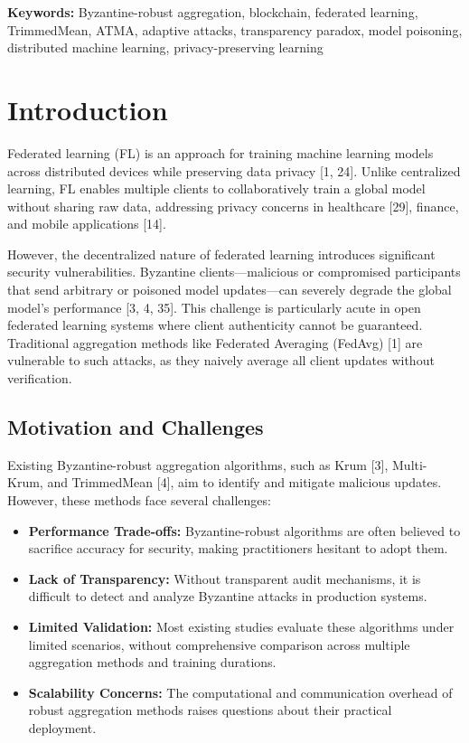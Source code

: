 \documentclass[12pt,a4paper,onecolumn]{article}
\begin{document}
\noindent\textbf{Keywords:} Byzantine-robust aggregation, blockchain, federated learning, TrimmedMean, ATMA, adaptive attacks, transparency paradox, model poisoning, distributed machine learning, privacy-preserving learning

\section{Introduction}
\label{sec:introduction}

Federated learning (FL) is an approach for training machine learning models across distributed devices while preserving data privacy [1, 24]. Unlike centralized learning, FL enables multiple clients to collaboratively train a global model without sharing raw data, addressing privacy concerns in healthcare [29], finance, and mobile applications [14].

However, the decentralized nature of federated learning introduces significant security vulnerabilities. Byzantine clients---malicious or compromised participants that send arbitrary or poisoned model updates---can severely degrade the global model's performance [3, 4, 35]. This challenge is particularly acute in open federated learning systems where client authenticity cannot be guaranteed. Traditional aggregation methods like Federated Averaging (FedAvg) [1] are vulnerable to such attacks, as they naively average all client updates without verification.

\subsection{Motivation and Challenges}

Existing Byzantine-robust aggregation algorithms, such as Krum [3], Multi-Krum, and TrimmedMean [4], aim to identify and mitigate malicious updates. However, these methods face several challenges:

\begin{itemize}
    \item \textbf{Performance Trade-offs:} Byzantine-robust algorithms are often believed to sacrifice accuracy for security, making practitioners hesitant to adopt them.
    \item \textbf{Lack of Transparency:} Without transparent audit mechanisms, it is difficult to detect and analyze Byzantine attacks in production systems.
    \item \textbf{Limited Validation:} Most existing studies evaluate these algorithms under limited scenarios, without comprehensive comparison across multiple aggregation methods and training durations.
    \item \textbf{Scalability Concerns:} The computational and communication overhead of robust aggregation methods raises questions about their practical deployment.
\end{itemize}
\end{document}
